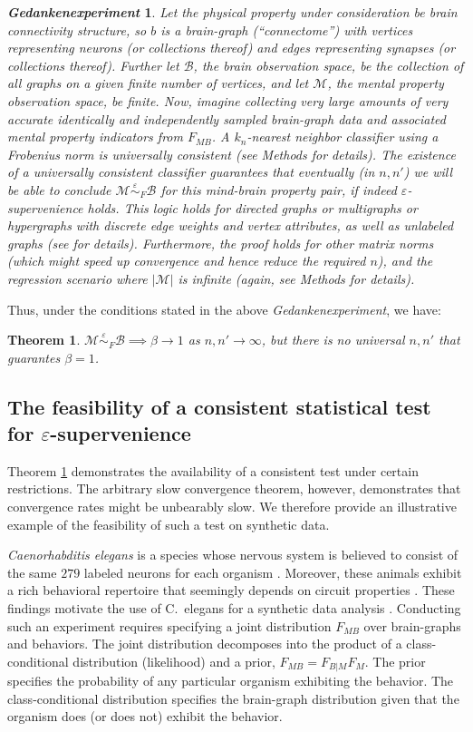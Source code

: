 \documentclass{article}
\newcommand{\conv}{\rightarrow}
\newcommand{\mB}{\mathcal{B}}
\newcommand{\mM}{\mathcal{M}}
\newcommand{\eps}{\varepsilon}
\providecommand{\mc}[1]{\mathcal{#1}}
\newcommand{\MeB}{\mM \overset{\varepsilon}{{\sim}}_{F} \mB}
\newtheorem{thm}{Theorem}
\newtheorem{thex}{\emph{Gedankenexperiment}}
\begin{document}
\begin{thex} \label{exp:1}
Let the physical property under consideration be brain connectivity structure, so $b$ is a brain-graph (``connectome'') with vertices representing neurons (or collections thereof) and edges representing synapses (or collections thereof). Further let $\mB$, the brain observation space, be the collection of all graphs on a given finite number of vertices, and let $\mc{M}$, the mental property observation space, be finite. Now, imagine collecting very large amounts of very accurate identically and independently sampled  brain-graph data and associated mental property indicators from $F_{MB}$. A $k_n$-nearest neighbor classifier using a Frobenius norm is universally consistent (see Methods for details). 
The existence of a universally consistent classifier guarantees that eventually (in $n,n'$) we will be able to conclude $\MeB$ for this mind-brain property pair, if indeed $\varepsilon$-supervenience holds. This logic holds for directed graphs or multigraphs or hypergraphs with discrete edge weights and vertex attributes, as well as unlabeled graphs (see \cite{VP11_unlabeled} for details). Furthermore, the proof holds for other matrix norms (which might speed up convergence and hence reduce the required $n$), and the regression scenario where $|\mM|$ is infinite (again, see Methods for details).  
\end{thex}
Thus, under the conditions stated in the above \emph{Gedankenexperiment}, we have:
\begin{thm} \label{thm:3}
	$\MeB \implies \beta \conv 1$ as $n,n'\conv \infty$, but there is no universal $n,n'$ that guarantes $\beta=1$.
\end{thm}


\subsection*{The feasibility of a consistent statistical test for $\eps$-supervenience} %


Theorem \ref{thm:3} demonstrates the availability of a consistent test under certain restrictions.  The arbitrary slow convergence theorem, however, demonstrates that convergence rates might be unbearably slow.  We therefore provide an illustrative example of the feasibility of such a test on synthetic data.

{\it Caenorhabditis elegans} is a species whose nervous system is believed to consist of the same $279$ labeled neurons for each organism \cite{Durbin87}. Moreover, these animals exhibit a rich behavioral repertoire that seemingly depends on circuit properties \cite{deBonoMaricq05}.  These findings motivate the use of C.~elegans for a synthetic data analysis \cite{GelmanShalizi11}.  Conducting such an experiment requires specifying a joint distribution $F_{MB}$ over brain-graphs and behaviors.  The joint distribution decomposes into the product of a class-conditional distribution (likelihood) and a prior, $F_{MB}=F_{B|M}F_M$. The prior  specifies the probability of any particular organism exhibiting the behavior.  The class-conditional distribution specifies the brain-graph distribution given that the organism does (or does not) exhibit the behavior. 
\end{document}
